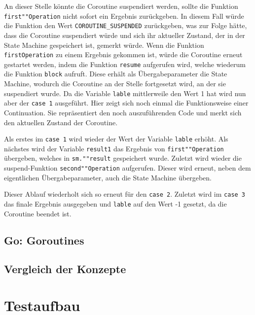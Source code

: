 \documentclass[fontsize=12pt,paper=a4,twoside=semi,parskip=half-,headsepline,headinclude]{scrreprt}
\begin{document}
An dieser Stelle könnte die Coroutine suspendiert werden, sollte die Funktion \texttt{first""Operation} nicht sofort ein Ergebnis zurückgeben. In diesem Fall würde die Funktion den Wert \texttt{COROUTINE\_SUSPENDED} zurückgeben\cite{Akhin2024}, was zur Folge hätte, dass die Coroutine suspendiert würde und sich ihr aktueller Zustand, der in der State Machine gespeichert ist, gemerkt würde. Wenn die Funktion \texttt{firstOperation} zu einem Ergebnis gekommen ist, würde die Coroutine erneut gestartet werden, indem die Funktion \texttt{resume} aufgerufen wird, welche wiederum die Funktion \texttt{block} aufruft. Diese erhält als Übergabeparameter die State Machine, wodurch die Coroutine an der Stelle fortgesetzt wird, an der sie suspendiert wurde. Da die Variable \texttt{lable} mittlerweile den Wert 1 hat wird nun aber der \texttt{case 1} ausgeführt. Hier zeigt sich noch einmal die Funktionsweise einer Continuation. Sie repräsentiert den noch auszuführenden Code und merkt sich den aktuellen Zustand der Coroutine. 

Als erstes im \texttt{case 1} wird wieder der Wert der Variable \texttt{lable} erhöht. Als nächstes wird der Variable \texttt{result1} das Ergebnis von \texttt{first""Operation} übergeben, welches in \texttt{sm.""result} gespeichert wurde. Zuletzt wird wieder die suspend-Funktion \texttt{second""Operation} aufgerufen. Dieser wird erneut, neben dem eigentlichen Übergabeparameter, auch die State Machine übergeben.

Dieser Ablauf wiederholt sich so erneut für den \texttt{case 2}. Zuletzt wird im \texttt{case 3} das finale Ergebnis ausgegeben und \texttt{lable} auf den Wert -1 gesetzt, da die Coroutine beendet ist.


\newpage

\section{Go: Goroutines}

\section{Vergleich der Konzepte}



\chapter{Testaufbau}
\end{document}
